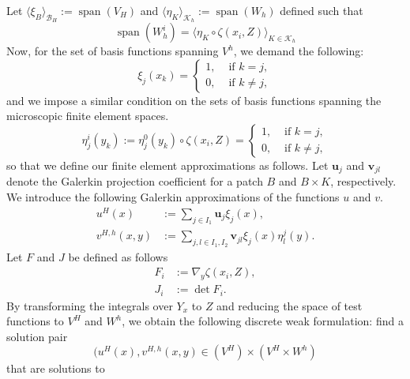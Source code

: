 \documentclass{article}
\newcommand{\micromesh}{\mathcal{ K}_h}
\newcommand{\B}{\mathcal{ B}}
\newcommand{\K}{\mathcal{ K}}
\renewcommand{\vec}{\mathbf}
\begin{document}
Let $\langle \xi_B \rangle_{\B_H}:= \operatorname{span}(V_H)$ and $ \langle \eta_K \rangle_{\K_h}:= \operatorname{span}(W_h)$ defined such that
\begin{equation}
    \operatorname{span}(W_h^i) = \langle \eta_K \circ \zeta(x_i,Z)\rangle_{K \in \micromesh}
\end{equation}
Now, for the set of basis functions spanning $V^h$, we demand the following:
\begin{equation}
    \xi_j(x_k) =  \begin{cases}
        1, &\text{ if }k=j,\\
        0, &\text{ if }k\neq j,
    \end{cases}
\end{equation}
and we impose a similar condition on the sets of basis functions spanning the microscopic finite element spaces.
\begin{equation}
    \eta^i_j(y_k) := \eta^0_j(y_k) \circ \zeta(x_i,Z)= \begin{cases}
        1, &\text{ if }k=j,\\
        0, &\text{ if }k\neq j,
    \end{cases}
\end{equation}
so that we define our finite element approximations as follows.
Let $\vec{u}_j$ and $\vec{v}_{jl}$ denote the Galerkin projection coefficient for a patch $B$ and $B\times K$, respectively. We introduce the following Galerkin approximations of the functions $u$ and $v$.
\begin{equation}
    \begin{split}
        u^H(x) &:= \sum_{j\in I_1} \vec{u}_j \xi_j(x),\\
        v^{H,h}(x,y) &:= \sum_{j,l \in I_1,I_2} \vec{v}_{jl} \xi_j(x) \eta_l^j(y).
    \end{split}
    \label{eq:trunc}
\end{equation}
Let $F$ and $J$ be defined as follows
\begin{equation}
    \begin{split}
        F_i &:= \nabla_y\zeta(x_i,Z),\\
        J_i &:= \operatorname{det}F_i.
    \end{split}
\end{equation}
By transforming the integrals over $Y_x$ to $Z$ and reducing the space of test functions to $V^H$ and $W^h$, we obtain the following discrete weak formulation: find a solution pair
\[(u^H(x),v^{H,h}(x,y) \in (V^H)\times (V^H\times W^h)\] that are solutions to
\end{document}
